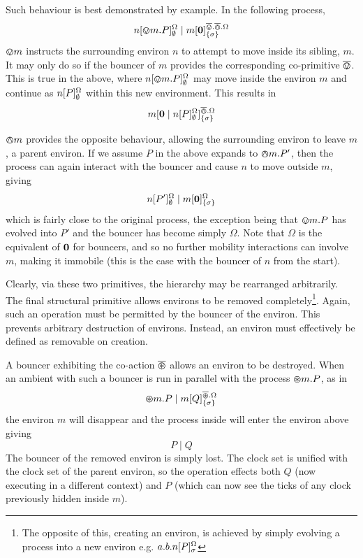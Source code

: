 \documentclass{acm_proc_article-sp}
\begin{document}
Such behaviour is best demonstrated by example.  In the following
 process,
\begin{displaymath}
{n}[ \varovee m.P ]^{\Omega}_{\emptyset} \mid {m}[ \textbf{0} ]^{\overline{\varovee}.\overline{\varowedge}.\Omega}_{\{\sigma\}}
\end{displaymath}
$\varovee m$ instructs the surrounding environ $n$ to attempt to move
inside its sibling, $m$. It may only do so if the bouncer of $m$
provides the corresponding co-primitive $\overline{\varovee}$.  This is true in the
above, where ${n}[ \varovee m.P ]^{\Omega}_{\emptyset}$ may move inside
the environ $m$ and continue as ${n}[ P ]^{\Omega}_{\emptyset}$ within
this new environment.  This results in
\begin{displaymath}
{m}[ \textbf{0} \mid {n}[ P ]^{\Omega}_{\emptyset} ]^{\overline{\varowedge}.\Omega}_{\{\sigma\}}
\end{displaymath}

$\varowedge m$ provides the opposite behaviour, allowing the surrounding
environ to leave $m$, a parent environ.  If we assume $P$ in the above
expands to $\varowedge m.P'$, then the process can again interact with the
bouncer and cause $n$ to move outside $m$, giving
\begin{displaymath}
{n}[ P' ]^{\Omega}_{\emptyset} \mid {m}[ \textbf{0} ]^{\Omega}_{\{\sigma\}}
\end{displaymath}
which is fairly close to the original process, the exception being that
$\varovee m.P$ has evolved into $P'$ and the bouncer has become simply
$\Omega$.  Note that $\Omega$ is the equivalent of $\textbf{0}$ for bouncers,
and so no further mobility interactions can involve $m$, making it
immobile (this is the case with the bouncer of $n$ from the start).

Clearly, via these two primitives, the hierarchy may be rearranged
arbitrarily.  The final structural primitive allows environs to be
removed completely\footnote{The opposite of this, creating an environ,
is achieved by simply evolving a process into a new environ
e.g. $a.b.{n}[ P ]^{\Omega}_{\sigma}$}.  Again, such an operation must
be permitted by the bouncer of the environ.  This prevents arbitrary
destruction of environs.  Instead, an environ must effectively be
defined as removable on creation.

A bouncer exhibiting the co-action $\overline{\varoast}$ allows an environ to be
destroyed.  When an ambient with such a bouncer is run in parallel with
the process $\varoast m.P$, as in
\begin{displaymath}
\varoast m.P \mid {m}[ Q ]^{\overline{\varoast}.\Omega}_{\{\sigma\}}
\end{displaymath}
the environ $m$ will disappear and the process inside will enter the
environ above giving
\begin{displaymath}
P \mid Q
\end{displaymath}
The bouncer of the removed environ is simply lost.  The clock set is
unified with the clock set of the parent environ, so the operation
effects both $Q$ (now executing in a different context) and $P$ (which
can now see the ticks of any clock previously hidden inside $m$).
\end{document}
